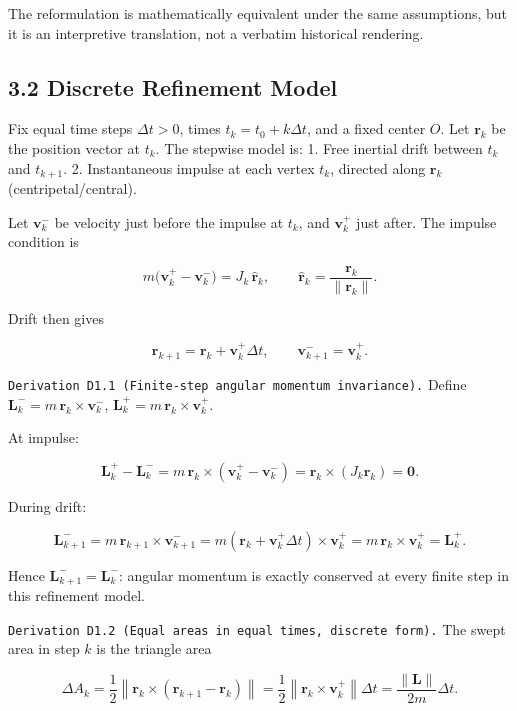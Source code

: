 \documentclass[
]{article}
\begin{document}
The reformulation is mathematically equivalent under the same
assumptions, but it is an interpretive translation, not a verbatim
historical rendering.

\hypertarget{discrete-refinement-model}{%
\subsection{3.2 Discrete Refinement
Model}\label{discrete-refinement-model}}

Fix equal time steps \(\Delta t>0\), times \(t_k=t_0+k\Delta t\), and a
fixed center \(O\). Let \(\mathbf r_k\) be the position vector at
\(t_k\). The stepwise model is: 1. Free inertial drift between \(t_k\)
and \(t_{k+1}\). 2. Instantaneous impulse at each vertex \(t_k\),
directed along \(\mathbf r_k\) (centripetal/central).

Let \(\mathbf v_k^{-}\) be velocity just before the impulse at \(t_k\),
and \(\mathbf v_k^{+}\) just after. The impulse condition is

\[
m\big(\mathbf v_k^{+}-\mathbf v_k^{-}\big)=J_k\,\hat{\mathbf r}_k,
\qquad \hat{\mathbf r}_k=\frac{\mathbf r_k}{\|\mathbf r_k\|}.
\]

Drift then gives

\[
\mathbf r_{k+1}=\mathbf r_k+\mathbf v_k^{+}\Delta t,
\qquad
\mathbf v_{k+1}^{-}=\mathbf v_k^{+}.
\]

\texttt{Derivation\ D1.1\ (Finite-step\ angular\ momentum\ invariance).}
Define \(\mathbf L_k^{-}=m\,\mathbf r_k\times \mathbf v_k^{-}\),
\(\mathbf L_k^{+}=m\,\mathbf r_k\times \mathbf v_k^{+}\).

At impulse:

\[
\mathbf L_k^{+}-\mathbf L_k^{-}
=m\,\mathbf r_k\times(\mathbf v_k^{+}-\mathbf v_k^{-})
=\mathbf r_k\times (J_k\hat{\mathbf r}_k)=\mathbf 0.
\]

During drift:

\[
\mathbf L_{k+1}^{-}
=m\,\mathbf r_{k+1}\times \mathbf v_{k+1}^{-}
=m(\mathbf r_k+\mathbf v_k^{+}\Delta t)\times \mathbf v_k^{+}
=m\,\mathbf r_k\times \mathbf v_k^{+}
=\mathbf L_k^{+}.
\]

Hence \(\mathbf L_{k+1}^{-}=\mathbf L_k^{-}\): angular momentum is
exactly conserved at every finite step in this refinement model.

\texttt{Derivation\ D1.2\ (Equal\ areas\ in\ equal\ times,\ discrete\ form).}
The swept area in step \(k\) is the triangle area

\[
\Delta A_k
=\frac12\left\|\mathbf r_k\times(\mathbf r_{k+1}-\mathbf r_k)\right\|
=\frac12\left\|\mathbf r_k\times \mathbf v_k^{+}\right\|\Delta t
=\frac{\|\mathbf L\|}{2m}\Delta t.
\]
\end{document}
